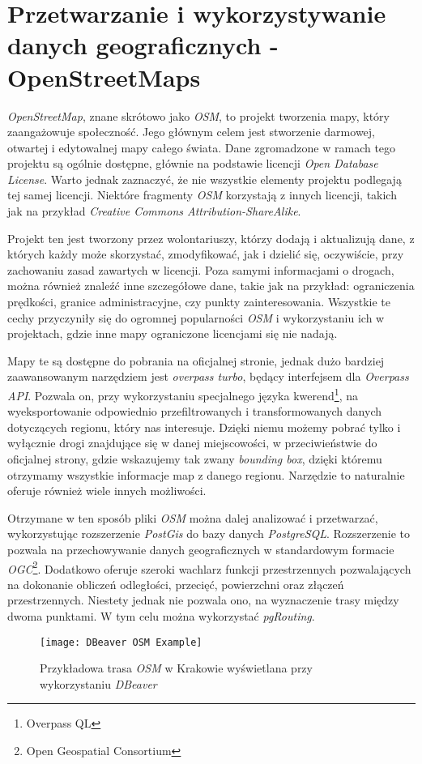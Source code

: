 \section{Przetwarzanie i wykorzystywanie danych geograficznych - OpenStreetMaps}

\par \emph{OpenStreetMap}, znane skrótowo jako \emph{OSM}, to projekt tworzenia mapy, który zaangażowuje społeczność. Jego głównym celem jest stworzenie darmowej, otwartej i edytowalnej mapy całego świata. Dane zgromadzone w ramach tego projektu są ogólnie dostępne, głównie na podstawie licencji \emph{Open Database License}. Warto jednak zaznaczyć, że nie wszystkie elementy projektu podlegają tej samej licencji. Niektóre fragmenty \emph{OSM} korzystają z innych licencji, takich jak na przykład \emph{Creative Commons Attribution-ShareAlike}.

\par Projekt ten jest tworzony przez wolontariuszy, którzy dodają i aktualizują dane, z których każdy może skorzystać, zmodyfikować, jak i dzielić się, oczywiście, przy zachowaniu zasad zawartych w licencji. Poza samymi informacjami o drogach, można również znaleźć inne szczegółowe dane, takie jak na przykład: ograniczenia prędkości, granice administracyjne, czy punkty zainteresowania. Wszystkie te cechy przyczyniły się do ogromnej popularności \emph{OSM} i wykorzystaniu ich w projektach, gdzie inne mapy ograniczone licencjami się nie nadają.

\par Mapy te są dostępne do pobrania na oficjalnej stronie\cite{OPEN_STREET_MAPS_SITE}, jednak dużo bardziej zaawansowanym narzędziem jest \emph{overpass turbo}\cite{OVERPASS_TURBO_SITE}, będący interfejsem dla \emph{Overpass API}. Pozwala on, przy wykorzystaniu specjalnego języka kwerend\footnote{Overpass QL}, na wyeksportowanie odpowiednio przefiltrowanych i transformowanych danych dotyczących regionu, który nas interesuje. Dzięki niemu możemy pobrać tylko i wyłącznie drogi znajdujące się w danej miejscowości, w przeciwieństwie do oficjalnej strony, gdzie wskazujemy  tak zwany \emph{bounding box}, dzięki któremu otrzymamy wszystkie informacje map z danego regionu. Narzędzie to naturalnie oferuje również wiele innych możliwości.

\par Otrzymane w ten sposób pliki \emph{OSM} można dalej analizować i przetwarzać, wykorzystując rozszerzenie \emph{PostGis}\cite{POSTGIS_SITE} do bazy danych \emph{PostgreSQL}\cite{POSTGRESQL_SITE}. Rozszerzenie to pozwala na przechowywanie danych geograficznych w standardowym formacie \emph{OGC}\footnote{Open Geospatial Consortium}. Dodatkowo oferuje szeroki wachlarz funkcji przestrzennych pozwalających na dokonanie obliczeń odległości, przecięć, powierzchni oraz złączeń przestrzennych. Niestety jednak nie pozwala ono, na wyznaczenie trasy między dwoma punktami. W tym celu można wykorzystać \emph{pgRouting}\cite{PGROUTING_SITE}.

\begin{figure}
    \centering
    \texttt{[image: DBeaver OSM Example]}
    \caption{Przykładowa trasa \emph{OSM} w Krakowie wyświetlana przy wykorzystaniu \emph{DBeaver}}
    \label{fig:dbeaverOSMExample}
\end{figure}